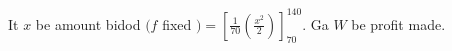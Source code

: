 It $x$ be amount bidod $(f$ fixed $)=\left[\frac{1}{70}\left(\frac{x^{2}}{2}\right)\right]_{70}^{140}$.
Ga $W$ be profit made.